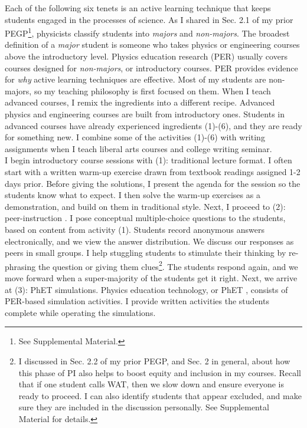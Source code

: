 \documentclass[../../../main.tex]{subfiles}
\begin{document}
Each of the following six tenets is an active learning technique that keeps students engaged in the processes of science.  As I shared in Sec. 2.1 of my prior PEGP\footnote{See Supplemental Material.}, physicists classify students into \textit{majors} and \textit{non-majors}.  The broadest definition of a \textit{major} student is someone who takes physics or engineering courses above the introductory level.  Physics education research (PER) usually covers courses designed for \textit{non-majors}, or introductory courses.  PER provides evidence for \textit{why} active learning techniques are effective.  Most of my students are non-majors, so my teaching philosophy is first focused on them.  When I teach advanced courses, I remix the ingredients into a different recipe.  Advanced physics and engineering courses are built from introductory ones.  Students in advanced courses have already experienced ingredients (1)-(6), and they are ready for something new.  I combine some of the activities (1)-(6) with writing assignments when I teach liberal arts courses and college writing seminar.
\\
\vspace{0.15cm}
I begin introductory course sessions with (1): traditional lecture format.  I often start with a written warm-up exercise drawn from textbook readings assigned 1-2 days prior.  Before giving the solutions, I present the agenda for the session so the students know what to expect.  I then solve the warm-up exercises as a demonstration, and build on them in traditional style.  Next, I proceed to (2): peer-instruction \cite{mazur2013peer}.  I pose conceptual multiple-choice questions to the students, based on content from activity (1).  Students record anonymous answers electronically, and we view the answer distribution.  We discuss our responses as peers in small groups.  I help stuggling students to stimulate their thinking by re-phrasing the question or giving them clues\footnote{I discussed in Sec. 2.2 of my prior PEGP, and Sec. 2 in general, about how this phase of PI also helps to boost equity and inclusion in my courses.  Recall that if one student calls WAT, then we slow down and ensure everyone is ready to proceed.  I can also identify students that appear excluded, and make sure they are included in the discussion personally.  See Supplemental Material for details.}.  The students respond again, and we move forward when a super-majority of the students get it right.  Next, we arrive at (3): PhET simulations.  Physics education technology, or PhET \cite{phet}, consists of PER-based simulation activities.  I provide written activities the students complete while operating the simulations.
\end{document}
